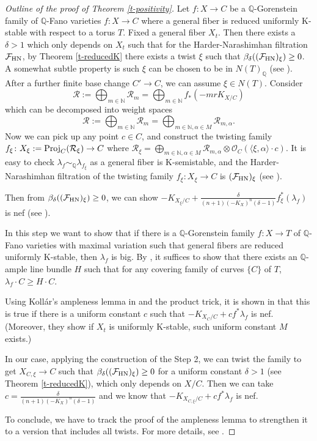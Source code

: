 \documentclass[12pt,reqno]{amsart}%
\newcommand{\bN}{{\mathbb{N} }}
\newcommand{\cR}{{\mathcal{R}}}
\newcommand{\cF}{\mathcal{F}}
\theoremstyle{definition}
\theoremstyle{remark}
\newcommand{\bQ}{{\mathbb{Q}}}
\begin{document}
\begin{proof}[Outline of the proof of Theorem \ref{t-positivity}]
Let $f\colon X\to C$ be a $\bQ$-Gorenstein family of $\bQ$-Fano varieties $f\colon X\to C$ where a general fiber is reduced uniformly K-stable with respect to a torus $T$. Fixed a general fiber $X_t$. Then there exists a $\delta>1$ which only depends on $X_t$ such that for the Harder-Narashimhan filtration  $\cF_{\rm HN}$, by Theorem \ref{t-reducedK} there exists a twist $\xi$ such that $\beta_{\delta}((\cF_{\rm HN})_{\xi})\ge 0$. A somewhat subtle property is such $\xi$ can be chosen to be in $N(T)_{\bQ}$ (see \cite[Proposition 5.6]{XZ19}). After a further finite base change $C'\to C$, we can assume $\xi\in N(T)$.
Consider 
$$\cR:=\bigoplus_{m\in \bN}\cR_m=\bigoplus_{m\in \bN}f_*(-mrK_{X/C})$$
which can be decomposed into weight spaces
$$\cR:=\bigoplus_{m\in \bN}\cR_m=\bigoplus_{m\in \bN,\alpha\in M}\cR_{m,\alpha}.$$
Now we can pick up any point $c\in C$, and construct the twisting family $f_{\xi}\colon X_{\xi}:={\rm Proj}_C(\cR_{\xi})\to C$ where
$\cR_{\xi}=\bigoplus_{m\in \bN,\alpha\in M}\cR_{m,\alpha}\otimes \mathcal{O}_{C}(\langle \xi,\alpha \rangle\cdot c).$ It is easy to check $\lambda_{f}\sim_{\bQ}\lambda_{f_{\xi}}$  as a general fiber is K-semistable, and the Harder-Narashimhan filtration of the twisting family $f_{\xi}\colon X_{\xi}\to C$ is $(\cF_{\rm HN})_{\xi}$ (see \cite[Corollary 5.3]{XZ19}).

Then from $\beta_{\delta}((\cF_{\rm HN})_{\xi})\ge 0$, we can show $-K_{X_{\xi}/C}+\frac{\delta}{(n+1)(-K_X)^n(\delta-1)}f^*_{\xi}(\lambda_f)$ is nef (see \cite[Proposition 4.9]{XZ20}).

\medskip


In this step we want to show that if there is a $\bQ$-Gorenstein family $f\colon X\to T$ of $\bQ$-Fano varieties with maximal variation such that general fibers are reduced uniformly K-stable,  then $\lambda_{f}$ is big.
By \cite{BDPP13}, it suffices to show that there exists an $\bQ$-ample line bundle $H$ such that for any covering family of curves $\{C\}$ of $T$, $\lambda_{f}\cdot C\ge H\cdot C$.

Using Koll\'ar's ampleness lemma in \cite{Kol90, KP17} and the product trick, it is shown in \cite{CP18} that this is true if there is a uniform constant $c$ such that $-K_{X_C/C}+c f^*\lambda_{f}$ is nef. (Moreover, they show  if $X_t$ is uniformly K-stable, such uniform constant $M$ exists.) 

In our case, applying the construction of the Step 2,  we can twist the family to get  $X_{C,\xi}\to C$ such that $\beta_{\delta}((\cF_{\rm HN})_{\xi})\ge 0$ for a uniform constant $\delta>1$ (see Theorem \ref{t-reducedK}), which only depends on $X/C$. Then we can take $c=\frac{\delta}{(n+1)(-K_X)^n(\delta-1)}$ and we know that $-K_{X_{C,\xi}/C}+c f^*\lambda_{f}$ is nef.

To conclude, we have to track the proof of the ampleness lemma to strengthen it to a version that includes all twists. For more details, see \cite[Section 6]{XZ19}.
\end{proof}
\end{document}
